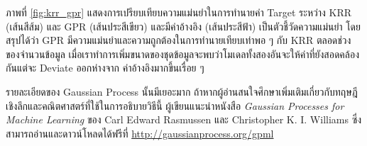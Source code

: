 ภาพที่ \ref{fig:krr_gpr} แสดงการเปรียบเทียบความแม่นยำในการทำนายค่า Target ระหว่าง KRR (เส้นสีส้ม) และ GPR (เส้นประสีเขียว) 
และมีค่าอ้างอิง (เส้นประสีฟ้า) เป็นตัวชี้วัดความแม่นยำ โดยสรุปได้ว่า GPR มีความแม่นยำและความถูกต้องในการทำนายเทียบเท่าพอ ๆ กับ KRR 
ตลอดช่วงของจำนวนข้อมูล เมื่อเราทำการเพิ่มขนาดของชุดข้อมูลจะพบว่าโมเดลทั้งสองอันจะให้ค่าที่ยังสอดคล้องกันแต่จะ Deviate ออกห่างจาก%
ค่าอ้างอิงมากขึ้นเรื่อย ๆ 

รายละเอียดของ Gaussian Process นั้นมีเยอะมาก ถ้าหากผู้อ่านสนใจศึกษาเพิ่มเติมเกี่ยวกับทฤษฎีเชิงลึกและคณิตศาสตร์ที่ใช้ในการอธิบายวิธีนี้%
ผู้เขียนแนะนำหนังสือ \textit{Gaussian Processes for Machine Learning} ของ Carl Edward Rasmussen และ 
Christopher K. I. Williams ซึ่งสามารถอ่านและดาวน์โหลดได้ฟรีที่ \url{http://gaussianprocess.org/gpml}
